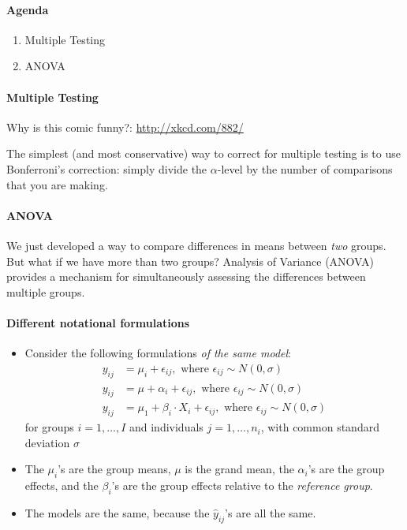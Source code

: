 \documentclass[10pt]{article}\usepackage[]{graphicx}\usepackage[]{color}
\begin{document}
\paragraph{Agenda}
\begin{enumerate}
  \itemsep0em
  \item Multiple Testing
  \item ANOVA

\end{enumerate}

\paragraph{Multiple Testing}

Why is this comic funny?: \url{http://xkcd.com/882/}

The simplest (and most conservative) way to correct for multiple testing is to use Bonferroni's correction: simply divide the $\alpha$-level by the number of comparisons that you are making. 


\paragraph{ANOVA} 
We just developed a way to compare differences in means between \emph{two} groups. But what if we have more than two groups? Analysis of Variance (ANOVA) provides a mechanism for simultaneously assessing the differences between multiple groups. 

\paragraph{Different notational formulations}
\begin{itemize}
  \item Consider the following formulations \emph{of the same model}:
  \begin{align*}
    y_{ij} &= \mu_i + \epsilon_{ij}, \text{ where } \epsilon_{ij} \sim N(0, \sigma) \\
    y_{ij} &= \mu + \alpha_i + \epsilon_{ij}, \text{ where } \epsilon_{ij} \sim N(0, \sigma) \\
    y_{ij} &= \mu_1 + \beta_i \cdot X_i + \epsilon_{ij}, \text{ where } \epsilon_{ij} \sim N(0, \sigma)
  \end{align*}
  for groups $i = 1,\ldots, I$ and individuals $j=1,\ldots,n_i$, with common standard deviation $\sigma$
  \item The $\mu_i$'s are the group means, $\mu$ is the grand mean, the $\alpha_i$'s are the group effects, and the $\beta_i$'s are the group effects relative to the \emph{reference group}.
  \item The models are the same, because the $\hat{y}_{ij}$'s are all the same.
  \end{itemize}
\end{document}
